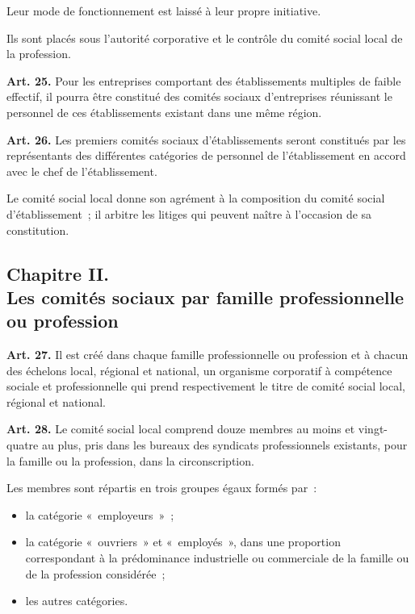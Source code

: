 \documentclass[french,twoside]{book} %
\newcommand{\labelchar}[1]{\textbf{\color{rubric} #1}}
\begin{document}
\noindent Leur mode de fonctionnement est laissé à leur propre initiative.\par
Ils sont placés sous l’autorité corporative et le contrôle du comité social local de la profession.\par
\bigbreak
\noindent \labelchar{Art. 25.} Pour les entreprises comportant des établissements multiples de faible effectif, il pourra être constitué des comités sociaux d’entreprises réunissant le personnel de ces établissements existant dans une même région.\par
\bigbreak
\noindent \labelchar{Art. 26.} Les premiers comités sociaux d’établissements seront constitués par les représentants des différentes catégories de personnel de l’établissement en accord avec le chef de l’établissement.\par
Le comité social local donne son agrément à la composition du comité social d’établissement ; il arbitre les litiges qui peuvent naître à l’occasion de sa constitution.
\subsection[Chapitre II. Les comités sociaux par famille professionnelle ou profession]{Chapitre II. \\
Les comités sociaux par famille professionnelle ou profession}
\noindent \labelchar{Art. 27.} Il est créé dans chaque famille professionnelle ou profession et à chacun des échelons local, régional et national, un organisme corporatif à compétence sociale et professionnelle qui prend respectivement le titre de comité social local, régional et national.\par
\bigbreak
\noindent \labelchar{Art. 28.} Le comité social local comprend douze membres au moins et vingt-quatre au plus, pris dans les bureaux des syndicats professionnels existants, pour la famille ou la profession, dans la circonscription.\par
Les membres sont répartis en trois groupes égaux formés par :\par

\begin{itemize}[itemsep=0pt,]
\item la catégorie « employeurs » ;
\item la catégorie « ouvriers » et « employés », dans une proportion correspondant à la prédominance industrielle ou commerciale de la famille ou de la profession considérée ;
\item les autres catégories.
\end{itemize}
\end{document}
